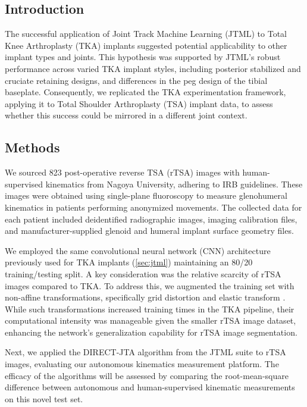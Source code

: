 \subsection{Introduction}
The successful application of Joint Track Machine Learning (JTML) to Total Knee Arthroplasty (TKA) implants suggested potential applicability to other implant types and joints.
This hypothesis was supported by JTML's robust performance across varied TKA implant styles, including posterior stabilized and cruciate retaining designs, and differences in the peg design of the tibial baseplate.
Consequently, we replicated the TKA experimentation framework, applying it to Total Shoulder Arthroplasty (TSA) implant data, to assess whether this success could be mirrored in a different joint context.

\subsection{Methods}
We sourced 823 post-operative reverse TSA (rTSA) images with human-supervised kinematics from Nagoya University, adhering to IRB guidelines.
These images were obtained using single-plane fluoroscopy to measure glenohumeral kinematics in patients performing anonymized movements.
The collected data for each patient included deidentified radiographic images, imaging calibration files, and manufacturer-supplied glenoid and humeral implant surface geometry files.


We employed the same convolutional neural network (CNN) architecture previously used for TKA implants \cite{wangDeepHighResolutionRepresentation2020} (\cref{sec:jtml}) maintaining an 80/20 training/testing split.
A key consideration was the relative scarcity of rTSA images compared to TKA.
To address this, we augmented the training set with non-affine transformations, specifically grid distortion and elastic transform \cite{buslaevAlbumentationsFastFlexible2020}.
While such transformations increased training times in the TKA pipeline, their computational intensity was manageable given the smaller rTSA image dataset, enhancing the network's generalization capability for rTSA image segmentation.

Next, we applied the DIRECT-JTA algorithm from the JTML suite to rTSA images, evaluating our autonomous kinematics measurement platform.
The efficacy of the algorithms will be assessed by comparing the root-mean-square difference between autonomous and human-supervised kinematic measurements on this novel test set.

